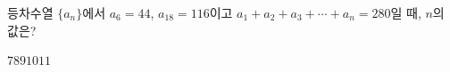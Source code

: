 등차수열 $\{a_n\}$에서 $a_6=44$, $a_{18}=116$이고 $a_1+a_2+a_3+\cdots+a_n=280$일 때, $n$의 값은?
\begin{choices32}{$7$}{$8$}{$9$}{$10$}{$11$}\end{choices32}
